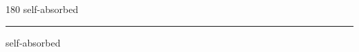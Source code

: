 
\begin{frame}
\begin{center}
\begin{turn}{180}
{\fontsize{2.5cm}{1em}\selectfont self-absorbed}
\end{turn}
\vspace{1em}\par  
\hrule
\vspace{1em}\par  
{\fontsize{2.5cm}{1em}\selectfont self-absorbed}
\end{center}
\end{frame}

